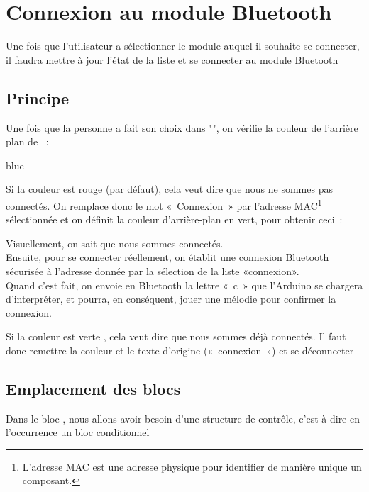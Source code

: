 \section{Connexion au module Bluetooth}

Une fois que l'utilisateur a sélectionner le module auquel il souhaite se connecter, il faudra mettre à jour l'état de la liste et se connecter au module Bluetooth

\subsection{Principe}
Une fois que la personne a fait son choix dans "", on vérifie la couleur de l'arrière plan de  :

\begin{items}{blue}{\Triangle}
    \item Si la couleur est rouge (par défaut), cela veut dire que nous ne sommes pas connectés.
    On remplace donc le mot « Connexion » par l'adresse MAC\footnote{L'adresse MAC est une adresse physique pour identifier de manière unique un composant.} sélectionnée et on définit la couleur d'arrière-plan en vert, pour obtenir ceci :
    
    
    
Visuellement, on sait que nous sommes connectés. \\
Ensuite,  pour se connecter réellement, on établit une connexion Bluetooth sécurisée à l'adresse donnée par la sélection de la liste «connexion». \\
Quand c'est fait, on envoie en Bluetooth la lettre « c » que l'Arduino se chargera d'interpréter, et pourra, en conséquent, jouer une mélodie pour confirmer la connexion.
    
   
    \item Si la couleur est verte , cela veut dire que nous sommes déjà connectés. Il faut donc remettre la couleur et le texte d'origine (« connexion ») et se déconnecter
    
\end{items}

\subsection{Emplacement des blocs}


Dans le bloc , nous allons avoir besoin d'une structure de contrôle, c'est à dire en l'occurrence un bloc conditionnel 


